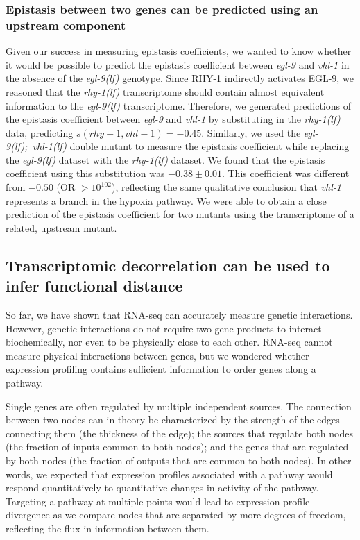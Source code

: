 \documentclass[9pt,twocolumn,twoside]{pnas-new}
\newcommand{\gene}[1]{\mbox{\emph{#1}}}
\newcommand{\egl}{\gene{egl-9(lf)}}
\newcommand{\rhy}{\gene{rhy-1(lf)}}
\newcommand{\eglvhl}{\gene{egl-9(lf); vhl-1(lf)}}
\newcommand{\eglp}{EGL-9}
\newcommand{\rhyp}{RHY-1}
\begin{document}
\subsubsection*{Epistasis between two genes can be predicted using an upstream component}
\color{black}
Given our success in measuring epistasis coefficients, we wanted to know whether
it would be possible to predict the epistasis coefficient between \gene{egl-9}
and \gene{vhl-1} in the absence of the \egl{} genotype. Since \rhyp{} indirectly
activates \eglp{}, we reasoned that the \rhy{} transcriptome should contain
almost equivalent information to the \egl{} transcriptome. Therefore, we
generated predictions of the epistasis coefficient between \gene{egl-9} and
\gene{vhl-1} by substituting in the \rhy{} data, predicting $s({rhy-1,vhl-1}) =
-0.45$. Similarly, we used the \eglvhl{} double mutant to measure the epistasis
coefficient while replacing the \egl{} dataset with the \rhy{} dataset. We found
that the epistasis coefficient using this substitution was $-0.38\pm 0.01$. This
coefficient was different from $-0.50$ (OR $>10^{102}$), reflecting the same
qualitative conclusion that \gene{vhl-1} represents a branch in the hypoxia
pathway. We were able to obtain a close prediction of the epistasis coefficient
for two mutants using the transcriptome of a related, upstream mutant.

\subsection*{Transcriptomic decorrelation can be used to infer functional distance}
\label{sub:decorrelation}
So far, we have shown that RNA-seq can accurately measure genetic interactions.
However, genetic interactions do not require two gene products to interact
biochemically, nor even to be physically close to each other. RNA-seq cannot
measure physical interactions between genes, but we wondered whether expression
profiling contains sufficient information to order genes along a pathway.

Single genes are often regulated by multiple independent sources. The connection
between two nodes can in theory be characterized by the strength of the edges
connecting them (the thickness of the edge); the sources that regulate both
nodes (the fraction of inputs common to both nodes); and the genes that are
regulated by both nodes (the fraction of outputs that are common to both nodes).
In other words, we expected that expression profiles associated with a pathway
would respond quantitatively to quantitative changes in activity of the pathway.
Targeting a pathway at multiple points would lead to expression profile
divergence as we compare nodes that are separated by more degrees of freedom,
reflecting the flux in information between them.
\end{document}
